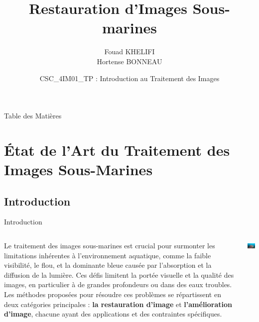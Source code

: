\documentclass[8pt,a4paper]{beamer}
\title[\thepage/\pageref{LastPage}]{Restauration d'Images Sous-marines}
\author[CSC\_4IM01\_TP ] {\small Fouad KHELIFI\\ Hortense BONNEAU}
\institute[Télécom Paris]{\large Télécom Paris}
\date[4IM01] {CSC\_4IM01\_TP : Introduction au Traitement des Images}
\numberwithin{figure}{section}
\begin{document}
\begin{frame}[plain]
\Large \titlepage
\end{frame}

\begin{frame}{Table des Matières}
  \tableofcontents 
\end{frame}

\section{État de l'Art du Traitement des Images Sous-Marines}
\subsection{Introduction}
\frame{\tableofcontents[currentsection]}
\begin{frame}{Introduction}
\begin{columns}
\begin{column}{7cm}
\par Le traitement des images sous-marines est crucial pour surmonter les limitations inhérentes à l'environnement aquatique, comme la faible visibilité, le flou, et la dominante bleue causée par l'absorption et la diffusion de la lumière. Ces défis limitent la portée visuelle et la qualité des images, en particulier à de grandes profondeurs ou dans des eaux troubles. Les méthodes proposées pour résoudre ces problèmes se répartissent en deux catégories principales : \textbf{la restauration d'image} et \textbf{l'amélioration d'image}, chacune ayant des applications et des contraintes spécifiques.
\end{column}
\begin{column}{3cm}
\begin{center}
\includegraphics[width=3cm]{image010.png}
\end{center}
\end{column}
\end{columns}
\end{frame}
\end{document}
